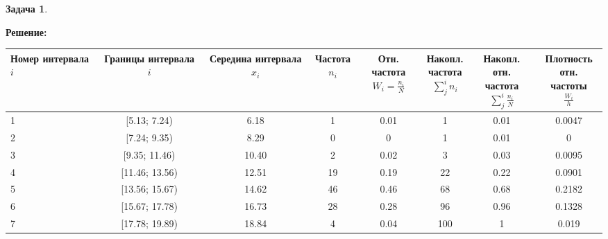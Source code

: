 \documentclass[a4paper,11pt]{article}
\theoremstyle{definition}
\newtheorem{problem}{Задача}\setlength{\parindent}{0pt}
\newenvironment{solution}
{\begin{shaded}\textbf{Решение:}\par\setlength{\parindent}{0pt}}
{\end{shaded}}
\begin{document}
\begin{problem}
    \begin{solution}
        \begin{table}[H]
            \centering
            \begin{adjustbox}{max width=\textwidth}
                \begin{tabular}{l c c c c c c c}
                    \toprule
                        \makecell{Номер\\интервала \( i \)} & 
                        \makecell{Границы \\ интервала \( i \)} & 
                        \makecell{Середина\\интервала \( x_i \)} & 
                        \makecell{Частота\\\( n_i \)} & 
                        \makecell{Отн. частота\\\( W_i = \frac{n_i}{N} \)} & 
                        \makecell{Накопл.\\частота\\\( \sum^i_j n_i \)} & 
                        \makecell{Накопл. отн.\\частота\\\( \sum^i_j \frac{n_i}{N} \)} & 
                        \makecell{Плотность\\отн. частоты\\\( \frac{W_i}{h} \)} \\
                            \midrule
                                1 & [5.13; 7.24) & 6.18 & 1 & 0.01 & 1 & 0.01 & 0.0047 \\
                                2 & [7.24; 9.35) & 8.29 & 0 & 0 & 1 & 0.01 & 0 \\
                                3 & [9.35; 11.46) & 10.40 & 2 & 0.02 & 3 & 0.03 & 0.0095 \\
                                4 & [11.46; 13.56) & 12.51 & 19 & 0.19 & 22 & 0.22 & 0.0901 \\
                                5 & [13.56; 15.67) & 14.62 & 46 & 0.46 & 68 & 0.68 & 0.2182 \\
                                6 & [15.67; 17.78) & 16.73 & 28 & 0.28 & 96 & 0.96 & 0.1328 \\
                                7 & [17.78; 19.89) & 18.84 & 4 & 0.04 & 100 & 1 & 0.019 \\
                            \bottomrule
                \end{tabular}
            \end{adjustbox}\label{tab:table}
        \end{table}  
    \end{solution}
    \end{problem}
\end{document}
